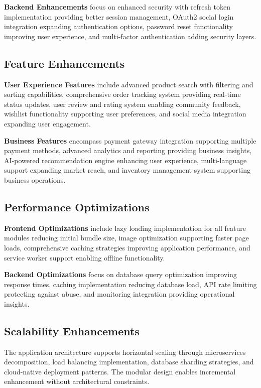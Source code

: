 \documentclass[12pt,a4paper]{article}
\begin{document}
\textbf{Backend Enhancements} focus on enhanced security with refresh token implementation providing better session management, OAuth2 social login integration expanding authentication options, password reset functionality improving user experience, and multi-factor authentication adding security layers.

\subsection{Feature Enhancements}

\textbf{User Experience Features} include advanced product search with filtering and sorting capabilities, comprehensive order tracking system providing real-time status updates, user review and rating system enabling community feedback, wishlist functionality supporting user preferences, and social media integration expanding user engagement.

\textbf{Business Features} encompass payment gateway integration supporting multiple payment methods, advanced analytics and reporting providing business insights, AI-powered recommendation engine enhancing user experience, multi-language support expanding market reach, and inventory management system supporting business operations.

\subsection{Performance Optimizations}

\textbf{Frontend Optimizations} include lazy loading implementation for all feature modules reducing initial bundle size, image optimization supporting faster page loads, comprehensive caching strategies improving application performance, and service worker support enabling offline functionality.

\textbf{Backend Optimizations} focus on database query optimization improving response times, caching implementation reducing database load, API rate limiting protecting against abuse, and monitoring integration providing operational insights.

\subsection{Scalability Enhancements}

The application architecture supports horizontal scaling through microservices decomposition, load balancing implementation, database sharding strategies, and cloud-native deployment patterns. The modular design enables incremental enhancement without architectural constraints.
\end{document}

